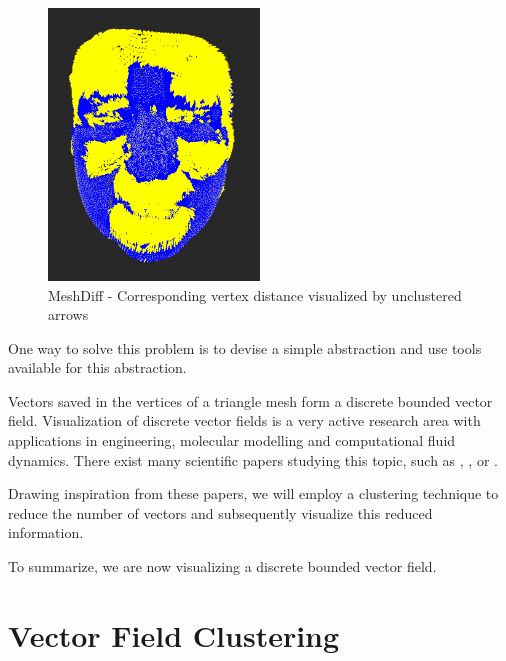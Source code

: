 \begin{figure}[h]
\centering
\includegraphics[width=0.5\textwidth]{./img/meshdiff-unclustered_arrows-single.png}
\caption[MeshDiff - Corresponding vertex distance visualized by unclustered arrows]{MeshDiff - Corresponding vertex distance visualized by unclustered arrows}
\label{fig:meshdiff-unclustered_vis}
\end{figure}

One way to solve this problem is to devise a simple abstraction and use tools available for this abstraction.

Vectors saved in the vertices of a triangle mesh form a discrete bounded vector field. Visualization of discrete vector fields is a very active research area with applications in engineering, molecular modelling and computational fluid dynamics. There exist many scientific papers studying this topic, such as \citet{Telea99}, \citet{Garcke00}, \citet{Du04} or \citet{Peng12}.

Drawing inspiration from these papers, we will employ a clustering technique to reduce the number of vectors and subsequently visualize this reduced information.

To summarize, we are now visualizing a discrete bounded vector field.

\section{Vector Field Clustering}
\label{sec:analysis-field_clustering}

